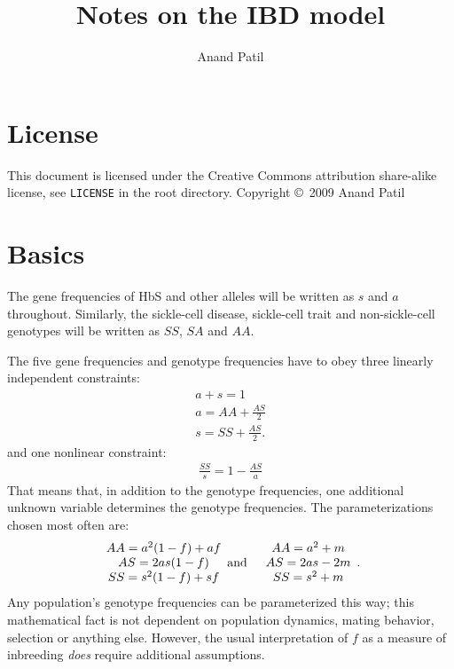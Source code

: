 \documentclass[a4paper]{article}
\begin{document}
\title{Notes on the IBD model}
\author{Anand Patil}
\maketitle

\section{License} %
\label{sec:license}
This document is licensed under the Creative Commons attribution share-alike license, see \texttt{LICENSE} in the root directory. Copyright \copyright\ 2009 Anand Patil

\section{Basics} %
\label{sec:basics}

The gene frequencies of HbS and other alleles will be written as $s$ and $a$ throughout. Similarly, the sickle-cell disease, sickle-cell trait and non-sickle-cell genotypes will be written as $SS$, $SA$ and $AA$.


The five gene frequencies and genotype frequencies have to obey three linearly independent constraints:
\begin{eqnarray*}
    a+s=1\\
    a=AA+\frac{AS}{2}\\
    s=SS+\frac{AS}{2}.
\end{eqnarray*}
and one nonlinear constraint:
\begin{eqnarray*}
    \frac{SS}{s}=1-\frac{AS}{a}
\end{eqnarray*}
That means that, in addition to the genotype frequencies, one additional unknown variable determines the genotype frequencies. The parameterizations chosen most often are:
\begin{eqnarray*}
\begin{array}{c}AA=a^2(1-f)+af\\AS=2as(1-f)\\SS=s^2(1-f)+sf\end{array} &\textup{and}&
\begin{array}{c}AA=a^2+m\\AS=2as-2m\\SS=s^2+m\end{array}.
\end{eqnarray*}
Any population's genotype frequencies can be parameterized this way; this mathematical fact is not dependent on population dynamics, mating behavior, selection or anything else. However, the usual interpretation of $f$ as a measure of inbreeding \emph{does} require additional assumptions. 
\end{document}
